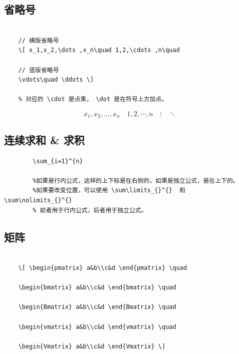 \documentclass[UTF8]{book}
\begin{document}
{	\subsection{省略号}
	\begin{lstlisting}
	
	// 横版省略号 
	\[ x_1,x_2,\dots ,x_n\quad 1,2,\cdots ,n\quad
	
	// 竖版省略号
	\vdots\quad \ddots \]

	% 对应的 \cdot 是点乘， \dot 是在符号上方加点。
	\end{lstlisting}
	\[ x_1,x_2,\dots ,x_n\quad 1,2,\cdots ,n\quad \vdots\quad \ddots \]
	
	\subsection{连续求和 \& 求积}

	\begin{lstlisting}
		\sum_{i=1}^{n}

		%如果是行内公式，这样的上下标是在右侧的，如果是独立公式，是在上下的。
		%如果要改变位置，可以使用 \sum\limits_{}^{}  和 \sum\nolimits_{}^{}
		% 前者用于行内公式，后者用于独立公式。
	\end{lstlisting}

	\subsection{矩阵}
	\begin{lstlisting}
	
	\[ \begin{pmatrix} a&b\\c&d \end{pmatrix} \quad
	
	\begin{bmatrix} a&b\\c&d \end{bmatrix} \quad
	
	\begin{Bmatrix} a&b\\c&d \end{Bmatrix} \quad
	
	\begin{vmatrix} a&b\\c&d \end{vmatrix} \quad
	
	\begin{Vmatrix} a&b\\c&d \end{Vmatrix} \]


\end{lstlisting}}
\end{document}
